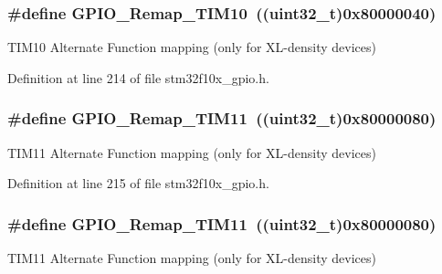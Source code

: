 \subsubsection[{\texorpdfstring{G\+P\+I\+O\+\_\+\+Remap\+\_\+\+T\+I\+M10}{GPIO_Remap_TIM10}}]{\setlength{\rightskip}{0pt plus 5cm}\#define G\+P\+I\+O\+\_\+\+Remap\+\_\+\+T\+I\+M10~(({\bf uint32\+\_\+t})0x80000040)}\hypertarget{group___g_p_i_o___remap__define_gac94252266a8fcb9ce7b55b5c55464110}{}\label{group___g_p_i_o___remap__define_gac94252266a8fcb9ce7b55b5c55464110}
T\+I\+M10 Alternate Function mapping (only for X\+L-\/density devices) 

Definition at line 214 of file stm32f10x\+\_\+gpio.\+h.

\subsubsection[{\texorpdfstring{G\+P\+I\+O\+\_\+\+Remap\+\_\+\+T\+I\+M11}{GPIO_Remap_TIM11}}]{\setlength{\rightskip}{0pt plus 5cm}\#define G\+P\+I\+O\+\_\+\+Remap\+\_\+\+T\+I\+M11~(({\bf uint32\+\_\+t})0x80000080)}\hypertarget{group___g_p_i_o___remap__define_ga0f308f1bb45e4c473766603b4bef47f8}{}\label{group___g_p_i_o___remap__define_ga0f308f1bb45e4c473766603b4bef47f8}
T\+I\+M11 Alternate Function mapping (only for X\+L-\/density devices) 

Definition at line 215 of file stm32f10x\+\_\+gpio.\+h.

\subsubsection[{\texorpdfstring{G\+P\+I\+O\+\_\+\+Remap\+\_\+\+T\+I\+M11}{GPIO_Remap_TIM11}}]{\setlength{\rightskip}{0pt plus 5cm}\#define G\+P\+I\+O\+\_\+\+Remap\+\_\+\+T\+I\+M11~(({\bf uint32\+\_\+t})0x80000080)}\hypertarget{group___g_p_i_o___remap__define_ga0f308f1bb45e4c473766603b4bef47f8}{}\label{group___g_p_i_o___remap__define_ga0f308f1bb45e4c473766603b4bef47f8}
T\+I\+M11 Alternate Function mapping (only for X\+L-\/density devices) 

